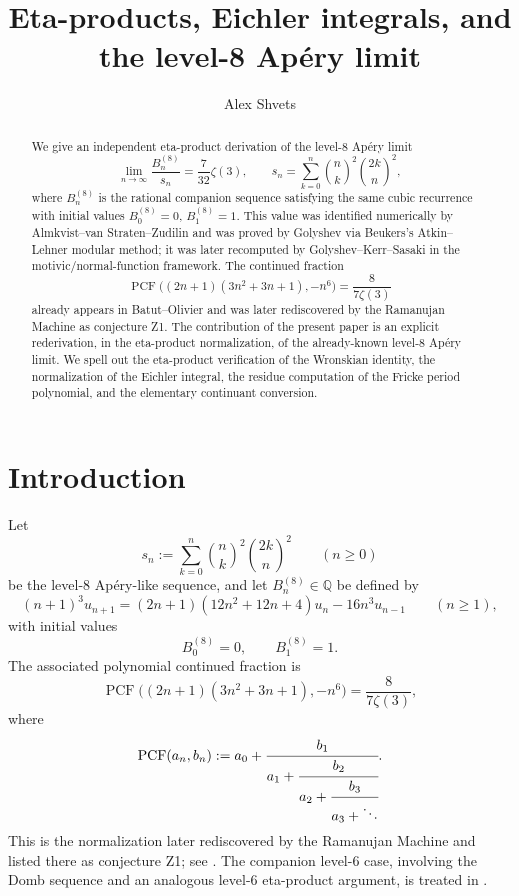 \documentclass[11pt]{amsart}
\title[Eta-products and the level-8 Apéry limit]{Eta-products, Eichler integrals, and the level-8 Apéry limit}
\author[A.~Shvets]{Alex Shvets}
\numberwithin{equation}{section}
\theoremstyle{plain}
\theoremstyle{definition}
\theoremstyle{remark}
\newcommand{\Q}{\mathbb{Q}}
\DeclareMathOperator{\PCF}{PCF}
\begin{document}
\begin{abstract}
We give an independent eta-product derivation of the level-$8$ Apéry limit
\[
\lim_{n\to\infty}\frac{B_n^{(8)}}{s_n}=\frac{7}{32}\zeta(3),
\qquad
s_n=\sum_{k=0}^n \binom{n}{k}^2\binom{2k}{n}^2,
\]
where $B_n^{(8)}$ is the rational companion sequence satisfying the same
cubic recurrence with initial values $B_0^{(8)}=0$, $B_1^{(8)}=1$. This
value was identified numerically by Almkvist--van Straten--Zudilin and was
proved by Golyshev via Beukers's Atkin--Lehner modular method; it was later
recomputed by Golyshev--Kerr--Sasaki in the motivic/normal-function
framework. The continued fraction
\[
\PCF\bigl((2n+1)(3n^2+3n+1),-n^6\bigr)=\frac{8}{7\zeta(3)}
\]
already appears in Batut--Olivier and was later rediscovered by the
Ramanujan Machine as conjecture Z1. The contribution of the present paper
is an explicit rederivation, in the eta-product normalization, of the
already-known level-$8$ Apéry limit. We spell out the eta-product verification of the
Wronskian identity, the normalization of the Eichler integral, the residue
computation of the Fricke period polynomial, and the elementary continuant
conversion.
\end{abstract}

\maketitle

\section{Introduction}

Let
\begin{equation}\label{eq:intro-s-def}
 s_n:=\sum_{k=0}^n \binom{n}{k}^2\binom{2k}{n}^2
 \qquad(n\ge 0)
\end{equation}
be the level-$8$ Apéry-like sequence, and let $B_n^{(8)}\in\Q$ be defined by
\begin{equation}\label{eq:intro-B-rec}
(n+1)^3u_{n+1}=(2n+1)(12n^2+12n+4)u_n-16n^3u_{n-1}
\qquad(n\ge 1),
\end{equation}
with initial values
\begin{equation}\label{eq:intro-B-init}
B_0^{(8)}=0,
\qquad
B_1^{(8)}=1.
\end{equation}
The associated polynomial continued fraction is
\begin{equation}\label{eq:intro-Z1}
\PCF\bigl((2n+1)(3n^2+3n+1),-n^6\bigr)=\frac{8}{7\zeta(3)},
\end{equation}
where
\[
\PCF(a_n,b_n):=a_0+\cfrac{b_1}{a_1+\cfrac{b_2}{a_2+\cfrac{b_3}{a_3+\ddots}}}.
\]
This is the normalization later rediscovered by the Ramanujan Machine and
listed there as conjecture Z1; see \cite{RMK21}. The companion level-$6$
case, involving the Domb sequence and an analogous level-$6$ eta-product
argument, is treated in \cite{ShvetsZ2}.
\end{document}
